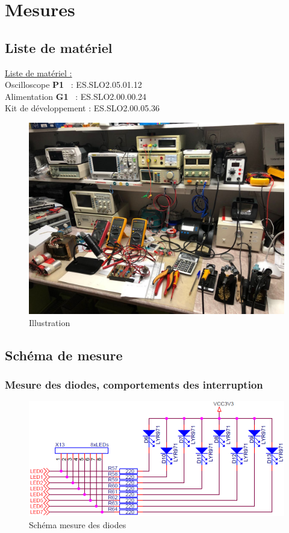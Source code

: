 \section{Mesures}
{
	\subsection{Liste de matériel}
	{
		\begin{flushleft}
			\underline{Liste de matériel :}\\
			Oscilloscope \textbf{P1} \ : \qquad ES.SLO2.05.01.12\\
			Alimentation \textbf{G1} \ : \qquad ES.SLO2.00.00.24\\
			Kit de développement : ES.SLO2.00.05.36
		\end{flushleft}
	
		\begin{figure}[h]
			\centering
			\includegraphics[width=0.7\linewidth]{IllustrationLab}
			\caption{Illustration}
			\label{fig:illustrationlab}
		\end{figure}
		
	}
	\clearpage
	\subsection{Schéma de mesure}
	{
		\subsubsection{Mesure des diodes, comportements des interruption}
		\begin{figure}[h]
			\centering
			\includegraphics[width=0.55\linewidth]{SchemaDiode}
			\caption{Schéma mesure des diodes}
			\label{fig:schemadiode}
		\end{figure}
	
}}
